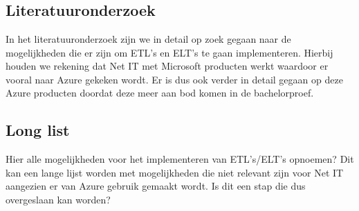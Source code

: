 
\chapter{}%
\label{ch:methodologie}


\section{Literatuuronderzoek}

In het literatuuronderzoek zijn we in detail op zoek gegaan naar de mogelijkheden die er zijn om ETL's en ELT's te gaan implementeren. Hierbij houden we rekening dat Net IT met Microsoft producten werkt waardoor er vooral naar Azure gekeken wordt. Er is dus ook verder in detail gegaan op deze Azure producten doordat deze meer aan bod komen in de bachelorproef.

\section{Long list}

Hier alle mogelijkheden voor het implementeren van ETL's/ELT's opnoemen? Dit kan een lange lijst worden met mogelijkheden die niet relevant zijn voor Net IT aangezien er van Azure gebruik gemaakt wordt. Is dit een stap die dus overgeslaan kan worden?


